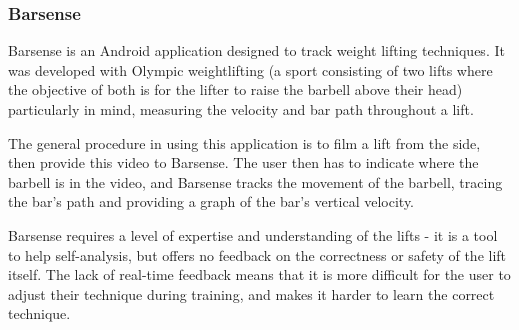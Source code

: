 \subsubsection{Barsense}

Barsense\cite{barsense} is an Android application designed to track weight lifting techniques. It was developed with Olympic weightlifting (a sport consisting of two lifts where the objective of both is for the lifter to raise the barbell above their head) particularly in mind, measuring the velocity and bar path throughout a lift.

The general procedure in using this application is to film a lift from the side, then provide this video to Barsense. The user then has to indicate where the barbell is in the video, and Barsense tracks the movement of the barbell, tracing the bar's path and providing a graph of the bar's vertical velocity.

Barsense requires a level of expertise and understanding of the lifts - it is a tool to help self-analysis, but offers no feedback on the correctness or safety of the lift itself. The lack of real-time feedback means that it is more difficult for the user to adjust their technique during training, and makes it harder to learn the correct technique.
